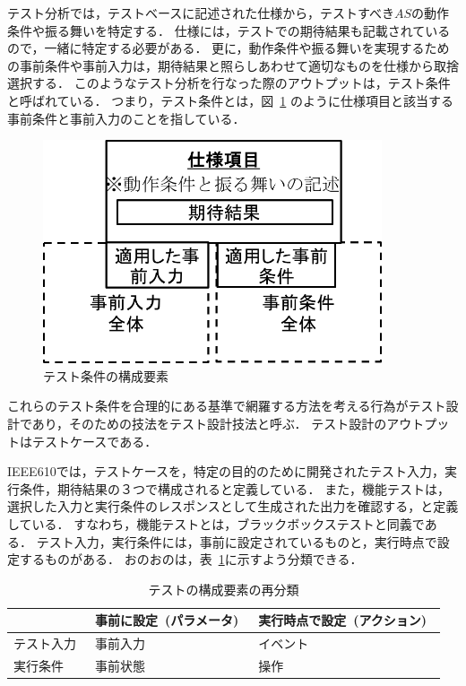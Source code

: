 テスト分析では，テストベースに記述された仕様から，テストすべき$AS$の動作条件や振る舞いを特定する．
仕様には，テストでの期待結果も記載されているので，一緒に特定する必要がある．
更に，動作条件や振る舞いを実現するための事前条件や事前入力は，期待結果と照らしあわせて適切なものを仕様から取捨選択する．
このようなテスト分析を行なった際のアウトプットは，テスト条件と呼ばれている\cite{ISTQB}．
つまり，テスト条件とは，図~\ref{fig:D-4-Fig1} のように仕様項目と該当する事前条件と事前入力のことを指している．
\begin{figure}[h]
  \begin{center}
  \includegraphics[width=10cm]{./image/D-4-Fig1.png}
  \caption{テスト条件の構成要素}
  \label{fig:D-4-Fig1}
  \end{center}
   \end{figure}

これらのテスト条件を合理的にある基準で網羅する方法を考える行為がテスト設計であり，そのための技法をテスト設計技法と呼ぶ．
テスト設計のアウトプットはテストケースである．

IEEE610では，テストケースを，特定の目的のために開発されたテスト入力，実行条件，期待結果の３つで構成されると定義している．
また，機能テストは，選択した入力と実行条件のレスポンスとして生成された出力を確認する，と定義している\cite{IEEE610}．
すなわち，機能テストとは，ブラックボックステストと同義である．
テスト入力，実行条件には，事前に設定されているものと，実行時点で設定するものがある．
おのおのは，表~\ref{tab:D-4-FigTPS}に示すよう分類できる．
\begin{table}[htbp]
  \centering
  \caption{テストの構成要素の再分類}
    \begin{tabular}{|l|l|l|}
    \hline
          & 事前に設定 (パラメータ)  & 実行時点で設定 (アクション)  \bigstrut\\
    \hline
    \hline
    テスト入力  & 事前入力  & イベント  \bigstrut\\
    \hline
    実行条件  & 事前状態  & 操作  \bigstrut\\
    \hline
    \end{tabular}%
  \label{tab:D-4-FigTPS}%
\end{table}%

